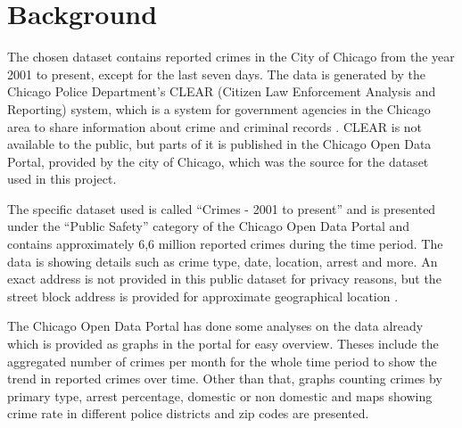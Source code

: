 \section{Background}

The chosen dataset contains reported crimes in the City of Chicago from the year 2001 to present, except for the last seven days. The data is generated by the Chicago Police Department’s CLEAR (Citizen Law Enforcement Analysis and Reporting) system, which is a system for government agencies in the Chicago area to share information about crime and criminal records \cite{CLEARpolice}. CLEAR is not available to the public, but parts of it is published in the Chicago Open Data Portal, provided by the city of Chicago, which was the source for the dataset used in this project. 

The specific dataset used is called “Crimes - 2001 to present” and is presented under the “Public Safety” category of the Chicago Open Data Portal and contains approximately 6,6 million reported crimes during the time period. The data is showing details such as crime type, date, location, arrest and more. An exact address is not provided in this public dataset for privacy reasons, but the street block address is provided for approximate geographical location \cite{cityOfChicago}. 

The Chicago Open Data Portal has done some analyses on the data already which is provided as graphs in the portal for easy overview. Theses include the aggregated number of crimes per month for the whole time period to show the trend in reported crimes over time. Other than that, graphs counting crimes by primary type, arrest percentage, domestic or non domestic and maps showing crime rate in different police districts and zip codes are presented. 